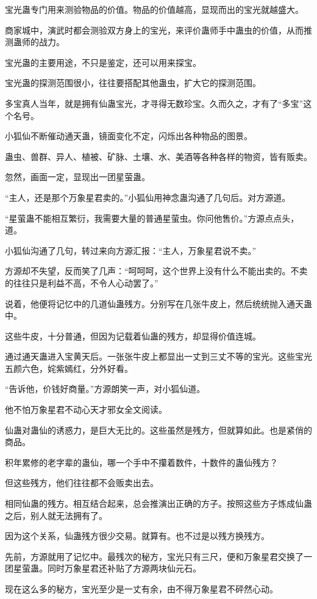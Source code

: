 \begin{this_body}
宝光蛊专门用来测验物品的价值。物品的价值越高，显现而出的宝光就越盛大。

商家城中，演武时都会测验双方身上的宝光，来评价蛊师手中蛊虫的价值，从而推测蛊师的战力。

宝光蛊的主要用途，不只是鉴定，还可以用来探宝。

宝光蛊的探测范围很小，往往要搭配其他蛊虫，扩大它的探测范围。

多宝真人当年，就是拥有仙蛊宝光，才寻得无数珍宝。久而久之，才有了“多宝”这个名号。

小狐仙不断催动通天蛊，镜面变化不定，闪烁出各种物品的图景。

蛊虫、兽群、异人、植被、矿脉、土壤、水、美酒等各种各样的物资，皆有贩卖。

忽然，画面一定，显现出一团星萤蛊。

“主人，还是那个万象星君卖的。”小狐仙用神念蛊沟通了几句后。对方源道。

“星萤蛊不能相互繁衍，我需要大量的普通星萤虫。你问他售价。”方源点点头，道。

小狐仙沟通了几句，转过来向方源汇报：“主人，万象星君说不卖。”

方源却不失望，反而笑了几声：“呵呵呵，这个世界上没有什么不能出卖的。不卖的往往只是利益不高，不令人心动罢了。”

说着，他便将记忆中的几道仙蛊残方。分别写在几张牛皮上，然后统统抛入通天蛊中。

这些牛皮，十分普通，但因为记载着仙蛊的残方，却显得价值连城。

通过通天蛊进入宝黄天后。一张张牛皮上都显出一丈到三丈不等的宝光。这些宝光五颜六色，姹紫嫣红，分外好看。

“告诉他，价钱好商量。”方源朗笑一声，对小狐仙道。

他不怕万象星君不动心天才邪女全文阅读。

仙蛊对蛊仙的诱惑力，是巨大无比的。这些虽然是残方，但就算如此。也是紧俏的商品。

积年累修的老字辈的蛊仙，哪一个手中不攥着数件，十数件的蛊仙残方？

但这些残方，他们往往都不会贩卖出去。

相同仙蛊的残方。相互结合起来，总会推演出正确的方子。按照这些方子炼成仙蛊之后，别人就无法拥有了。

因为这个关系，仙蛊残方很少交易。就算有。也不过是以残方换残方。

先前，方源就用了记忆中。最残次的秘方，宝光只有三尺，便和万象星君交换了一团星萤蛊。同时万象星君还补贴了方源两块仙元石。

现在这么多的秘方，宝光至少是一丈有余，由不得万象星君不砰然心动。


\end{this_body}

